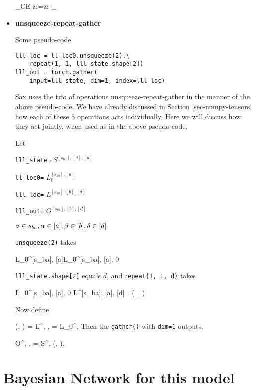 \begin{itemize}
\beqa
\call_{CE} &=& \sum_{\s\in[n_\rvs]}
\eeqa

\item {\bf unsqueeze-repeat-gather}

Some pseudo-code
\begin{mdframed}[hidealllines=true,backgroundcolor=blue!10]
\begin{verbatim}
lll_loc = ll_loc0.unsqueeze(2).\
    repeat(1, 1, lll_state.shape[2])
lll_out = torch.gather(
    input=lll_state, dim=1, index=lll_loc)
\end{verbatim}
\end{mdframed}
Sax uses the trio of operations unsqueeze-repeat-gather
in the manner of the above pseudo-code. We have already 
discussed in Section \ref{sec-numpy-tensors}
how each of these 3 operations
acts individually. Here we will discuss how they
act jointly, when used as in the above
pseudo-code.

Let

{\tt lll\_state=} $S^{[s_{ba}],[a], [d]}$

{\tt ll\_loc0=} $L_0^{[s_{ba}], [a]}$

{\tt lll\_loc=} $L^{[s_{ba}], [b], [d]}$

{\tt lll\_out=} $O^{[s_{ba}], [b], [d]}$

$\sigma\in s_{ba}, \alpha\in[a], \beta\in[b], \delta\in[d]$

{\tt unsqueeze(2)} takes 

\beq
L_0^{[s_{ba}], [a]}\rarrow L_0^{[s_{ba}], [a], 0}
\eeq

{\tt lll\_state.shape[2]} equals $d$, and {\tt repeat(1, 1, d)}
takes

\beq
L_0^{[s_{ba}], [a], 0}\rarrow
L^{[s_{ba}], [a], [d]}= 
(_
{}) 
\eeq

Now define 

\beq
\lam(\s, \alp)
=
L^{\s, \alp, \delta}=
L_0^{\s, \alp}
\eeq 
Then the {\tt gather()} 
with {\tt dim=1} outputs.

\beq 
O^{\s, \alp, \delta}=
S^{\s, \lam(\s, \alp), \delta}
\eeq





\end{itemize}

\section{Bayesian Network for this model}

